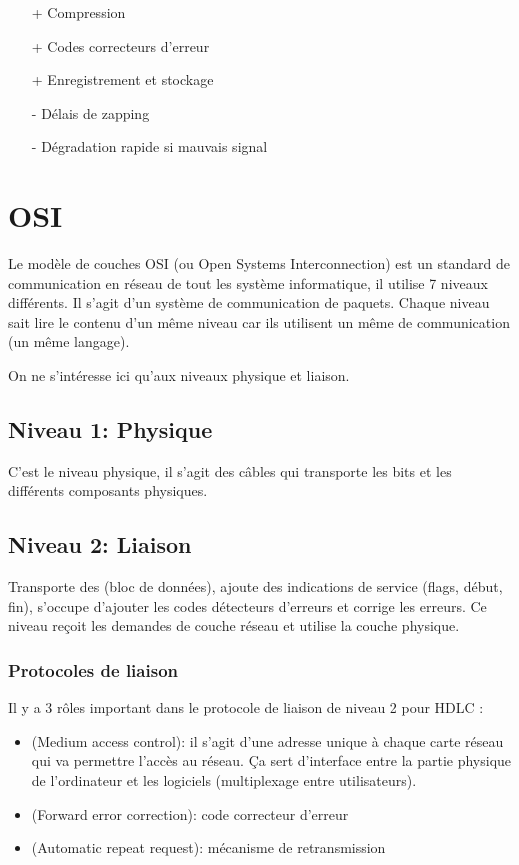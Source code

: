 \begin{itemize}
\item[+]Compression
\item[+]Codes correcteurs d'erreur
\item[+]Enregistrement et stockage
\item[-]Délais de zapping
\item[-]Dégradation rapide si mauvais signal
\end{itemize}

\chapter{OSI}

Le modèle de couches OSI (ou Open Systems Interconnection) est un standard de communication en réseau de tout les système informatique, il utilise 7 niveaux différents. Il s'agit d'un système de communication de paquets. Chaque niveau sait lire le contenu d'un même niveau car ils utilisent un même  de communication (un même langage).

On ne s'intéresse ici qu'aux niveaux physique et liaison.

\section{Niveau 1: Physique}

C'est le niveau physique, il s'agit des câbles qui transporte les bits et les différents composants physiques.

\section{Niveau 2: Liaison}

Transporte des  (bloc de données), ajoute des indications de service (flags, début, fin), s'occupe d'ajouter les codes détecteurs d'erreurs et corrige les erreurs. Ce niveau reçoit les demandes de couche réseau et utilise la couche physique.

\subsection{Protocoles de liaison}

Il y a 3 rôles important dans le protocole de liaison de niveau 2 pour HDLC :
\begin{itemize}
\item {}(Medium access control): il s'agit d'une adresse unique à chaque carte réseau qui va permettre l’accès au réseau. Ça sert d'interface entre la partie physique de l'ordinateur et les logiciels (multiplexage entre utilisateurs).
\item {}(Forward error correction): code correcteur d'erreur
\item {}(Automatic repeat request): mécanisme de retransmission
\end{itemize}

